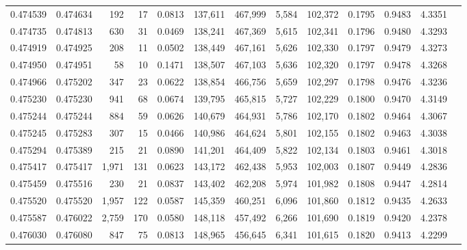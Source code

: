 \begin{tabular}{rrrrrrrrrrrrr}
0.474539 & 0.474634 &   192 &    17 &                                     0.0813 & 137,611 & 467,999 &   5,584 & 102,372 & 0.1795 & 0.9483 & 4.3351 \\
0.474735 & 0.474813 &   630 &    31 &                                     0.0469 & 138,241 & 467,369 &   5,615 & 102,341 & 0.1796 & 0.9480 & 4.3293 \\
0.474919 & 0.474925 &   208 &    11 &                                     0.0502 & 138,449 & 467,161 &   5,626 & 102,330 & 0.1797 & 0.9479 & 4.3273 \\
0.474950 & 0.474951 &    58 &    10 &                                     0.1471 & 138,507 & 467,103 &   5,636 & 102,320 & 0.1797 & 0.9478 & 4.3268 \\
0.474966 & 0.475202 &   347 &    23 &                                     0.0622 & 138,854 & 466,756 &   5,659 & 102,297 & 0.1798 & 0.9476 & 4.3236 \\
0.475230 & 0.475230 &   941 &    68 &                                     0.0674 & 139,795 & 465,815 &   5,727 & 102,229 & 0.1800 & 0.9470 & 4.3149 \\
0.475244 & 0.475244 &   884 &    59 &                                     0.0626 & 140,679 & 464,931 &   5,786 & 102,170 & 0.1802 & 0.9464 & 4.3067 \\
0.475245 & 0.475283 &   307 &    15 &                                     0.0466 & 140,986 & 464,624 &   5,801 & 102,155 & 0.1802 & 0.9463 & 4.3038 \\
0.475294 & 0.475389 &   215 &    21 &                                     0.0890 & 141,201 & 464,409 &   5,822 & 102,134 & 0.1803 & 0.9461 & 4.3018 \\
0.475417 & 0.475417 & 1,971 &   131 &                                     0.0623 & 143,172 & 462,438 &   5,953 & 102,003 & 0.1807 & 0.9449 & 4.2836 \\
0.475459 & 0.475516 &   230 &    21 &                                     0.0837 & 143,402 & 462,208 &   5,974 & 101,982 & 0.1808 & 0.9447 & 4.2814 \\
0.475520 & 0.475520 & 1,957 &   122 &                                     0.0587 & 145,359 & 460,251 &   6,096 & 101,860 & 0.1812 & 0.9435 & 4.2633 \\
0.475587 & 0.476022 & 2,759 &   170 &                                     0.0580 & 148,118 & 457,492 &   6,266 & 101,690 & 0.1819 & 0.9420 & 4.2378 \\
0.476030 & 0.476080 &   847 &    75 &                                     0.0813 & 148,965 & 456,645 &   6,341 & 101,615 & 0.1820 & 0.9413 & 4.2299 \\

\end{tabular}
